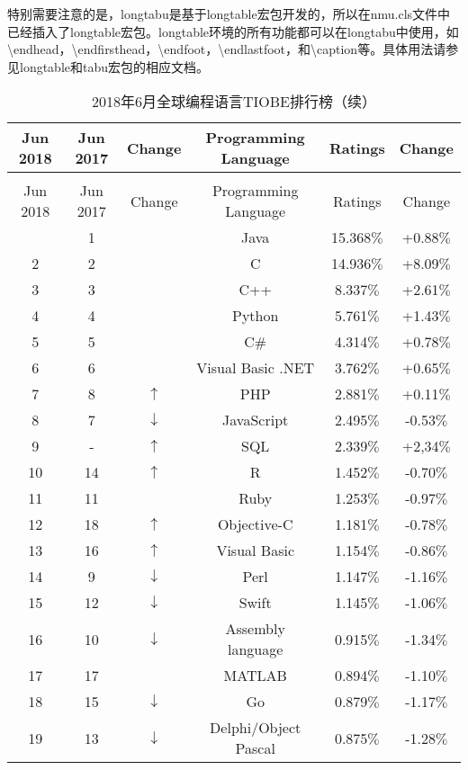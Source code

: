 特别需要注意的是，longtabu是基于longtable宏包开发的，所以在nmu.cls文件中已经插入了longtable宏包。longtable环境的所有功能都可以在longtabu中使用，如\textbackslash endhead，\textbackslash endfirsthead，\textbackslash endfoot，\textbackslash endlastfoot，和\textbackslash caption等。具体用法请参见longtable和tabu宏包的相应文档。
\begin{longtabu}{cccccc}
	\caption{2018年6月全球编程语言TIOBE排行榜}\label{tab:tabu_test_3}\\
	\toprule
	Jun 2018   & Jun 2017 & Change & Programming Language & Ratings &Change\\
	\midrule%
	\endfirsthead
	\caption{2018年6月全球编程语言TIOBE排行榜（续）}\\
	\toprule
	Jun 2018   & Jun 2017 & Change & Programming Language & Ratings &Change \\
	\midrule%
	\endhead
	\bottomrule%
		&	1	&		&	Java	&	15.368$\%$	&	+0.88$\%$	\\
2	&	2	&		&	C	&	14.936$\%$	&	+8.09$\%$	\\
3	&	3	&		&	C++	&	8.337$\%$	&	+2.61$\%$	\\
4	&	4	&		&	Python	&	5.761$\%$	&	+1.43$\%$	\\
5	&	5	&		&	C$\#$	&	4.314$\%$	&	+0.78$\%$	\\
6	&	6	&		&	Visual Basic .NET	&	3.762$\%$	&	+0.65$\%$	\\
7	&	8	&	$\uparrow$	&	PHP	&	2.881$\%$	&	+0.11$\%$	\\
8	&	7	&	$\downarrow$	&	JavaScript	&	2.495$\%$	&	-0.53$\%$	\\
9	&	-	&	$\uparrow$	&	SQL	&	2.339$\%$	&	+2,34$\%$	\\
10	&	14	&	$\uparrow$	&	R	&	1.452$\%$	&	-0.70$\%$	\\
11	&	11	&		&	Ruby	&	1.253$\%$	&	-0.97$\%$	\\
12	&	18	&	$\uparrow$	&	Objective-C	&	1.181$\%$	&	-0.78$\%$	\\
13	&	16	&	$\uparrow$	&	Visual Basic	&	1.154$\%$	&	-0.86$\%$	\\
14	&	9	&	$\downarrow$	&	Perl	&	1.147$\%$	&	-1.16$\%$	\\
15	&	12	&	$\downarrow$	&	Swift	&	1.145$\%$	&	-1.06$\%$	\\
16	&	10	&	$\downarrow$	&	Assembly language	&	0.915$\%$	&	-1.34$\%$	\\
17	&	17	&		&	MATLAB	&	0.894$\%$	&	-1.10$\%$	\\
18	&	15	&	$\downarrow$	&	Go	&	0.879$\%$	&	-1.17$\%$	\\
19	&	13	&	$\downarrow$	&	Delphi/Object Pascal	&	0.875$\%$	&	-1.28$\%$	\\

\end{longtabu}
